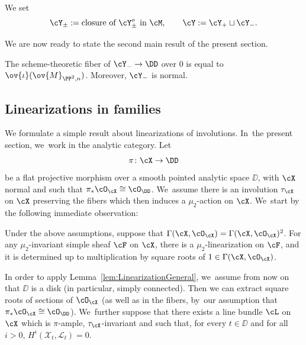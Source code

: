 We set
\begin{equation*}\label{eq:DefYprimeFamily}
\cY_{\pm} :=\text{closure of $\cY_{\pm}^o$ in $\cM$},\qquad
\cY:=\cY_{+}\sqcup \cY_{-}.
\end{equation*}

We are now ready to state the second main result of the present section.

\begin{prop}\label{prop:negfiber}
The scheme-theoretic fiber of $\cY_{-}\to\DD$ over $0$ is equal to $\ov{\iota}(\ov{M}_{\PP^2,n})$. Moreover, $\cY_{-}$ is normal.
\end{prop}

\subsection{Linearizations in families}\label{subsec:LinearizationFamily}

We formulate a simple result about linearizations of involutions. In~the present section, we~work in the analytic category.
Let
\[
\pi\colon \cX \to \DD
\]
be a flat projective morphism over a smooth pointed analytic space $\DD$, with $\cX$ normal and such that $\pi_{*}{\cO}_{\cX}\cong{\cO}_\DD$. We~assume there is an involution $\tau_{\cX}$ on $\cX$ preserving the fibers which then induces a $\mu_2$-action on $\cX$. We~start by the following immediate observation:

\begin{lemm}\label{lem:LinearizationGeneral}
Under the above assumptions, suppose that $\Gamma(\cX, {\cO}_{\cX})=\Gamma(\cX,{\cO}_{\cX})^2$.
For any $\mu_2$-invariant simple sheaf $\cF$ on $\cX$, there is a $\mu_2$-linearization on $\cF$, and it is determined up to multiplication by square roots of $1\in \Gamma(\cX, {\cO}_{\cX})$.
\end{lemm}

In order to apply Lemma~\ref{lem:LinearizationGeneral}, we~assume from now on that $\DD$ is a disk (in particular, simply connected).
Then we can extract square roots of sections of $\cO_{\cX}$ (as well as in the fibers, by~our assumption that $\pi_{*}{\cO}_{\cX}\cong{\cO}_\DD$). We~further suppose that there exists a line bundle $\cL$ on $\cX$ which is $\pi$-ample, $\tau_{\cX}$-invariant and such that, for every $t\in\DD$ and for all $i>0$, $H^i(\mathcal{X}_t,\mathcal{L}_t)=0$.

